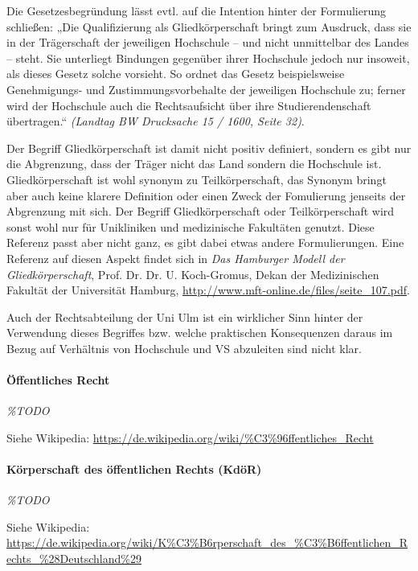\documentclass[
10pt,
a4paper,
twoside,								%
titlepage=false,							%
draft=false								%
]{scrartcl}
\begin{document}
Die Gesetzesbegründung lässt evtl. auf die Intention hinter der Formulierung schließen: „Die Qualifizierung als Gliedkörperschaft bringt zum Ausdruck, dass sie in der Trägerschaft der jeweiligen Hochschule – und nicht unmittelbar des Landes – steht. Sie unterliegt Bindungen gegenüber ihrer Hochschule jedoch nur insoweit, als dieses Gesetz solche vorsieht. So ordnet das Gesetz beispielsweise Genehmigungs- und Zustimmungsvorbehalte der jeweiligen Hochschule zu; ferner wird der Hochschule auch die Rechtsaufsicht über ihre Studierendenschaft übertragen.“ \textit{(Landtag BW Drucksache 15 / 1600, Seite 32)}.

Der Begriff Gliedkörperschaft ist damit nicht positiv definiert, sondern es gibt nur die Abgrenzung, dass der Träger nicht das Land sondern die Hochschule ist. Gliedkörperschaft ist wohl synonym zu Teilkörperschaft, das Synonym bringt aber auch keine klarere Definition oder einen Zweck der Fomulierung jenseits der Abgrenzung mit sich. Der Begriff Gliedkörperschaft oder Teilkörperschaft wird sonst wohl nur für Unikliniken und medizinische Fakultäten genutzt. Diese Referenz passt aber nicht ganz, es gibt dabei etwas andere Formulierungen. Eine Referenz auf diesen Aspekt findet sich in \emph{Das Hamburger Modell der Gliedkörperschaft}, Prof. Dr. Dr. U. Koch-Gromus, Dekan der Medizinischen Fakultät der Universität Hamburg, \url{http://www.mft-online.de/files/seite_107.pdf}.

Auch der Rechtsabteilung der Uni Ulm ist ein wirklicher Sinn hinter der Verwendung dieses Begriffes bzw. welche praktischen Konsequenzen daraus im Bezug auf Verhältnis von Hochschule und VS abzuleiten sind nicht klar.



\paragraph{Öffentliches Recht}

\textit{\%TODO}

Siehe Wikipedia: \url{https://de.wikipedia.org/wiki/%C3%96ffentliches_Recht}



\paragraph{Körperschaft des öffentlichen Rechts (KdöR)}

\textit{\%TODO}

Siehe Wikipedia: \sloppy \url{https://de.wikipedia.org/wiki/K%C3%B6rperschaft_des_%C3%B6ffentlichen_Rechts_%28Deutschland%29}
\end{document}
